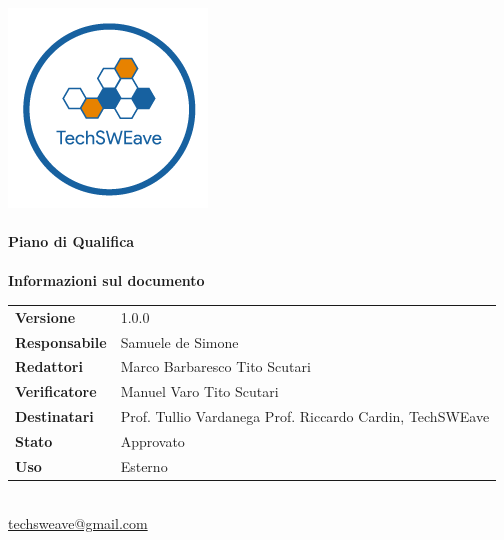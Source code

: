 \documentclass[a4paper]{article}
\begin{document}
\begin{titlepage}
    \begin{center}
        \includegraphics{../../../Images/logo}\\
        \vspace{20px}
        \textcolor{logo}{\hrulefill}\\
        \vspace{20px}
        \textbf{\huge\textcolor{logo}{Piano di Qualifica}}\\
        \vspace{10px}
        \textcolor{logo}{\hrulefill}\\
        \vspace{40px}
        \textbf{\Large Informazioni sul documento}\\
        \vspace{20px}
        \begin{tabular}{p{100px} | p{100px}}
            \textbf{Versione}     & 1.0.0                                                                      \\
            \textbf{Responsabile} & Samuele de Simone                                                          \\
            \textbf{Redattori}    & Marco Barbaresco \newline Tito Scutari                                     \\
            \textbf{Verificatore} & Manuel Varo \newline Tito Scutari                                          \\
            \textbf{Destinatari}  & Prof. Tullio Vardanega \newline Prof. Riccardo Cardin, \newline TechSWEave \\
            \textbf{Stato}        & Approvato                                                                  \\
            \textbf{Uso}          & Esterno                                                                    \\
        \end{tabular}\\
        \vspace{60px}
        \href{mailto:techsweave@gmail.com}{techsweave@gmail.com}\\

    \end{center}
\end{titlepage}
\end{document}
